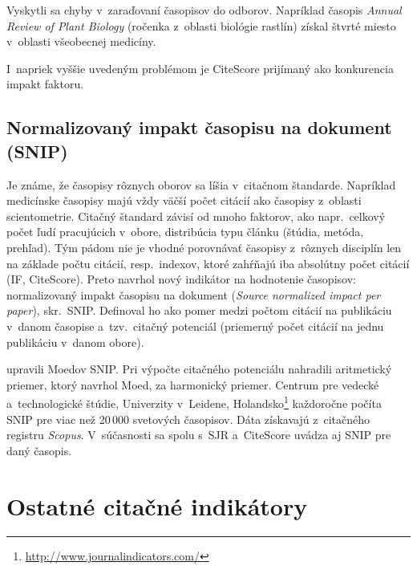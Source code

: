 Vyskytli sa chyby v~zaraďovaní časopisov do odborov.  Napríklad časopis
\emph{Annual Review of Plant Biology} (ročenka z~oblasti biológie rastlín)
získal štvrté miesto v~oblasti všeobecnej medicíny.

I~napriek vyššie uvedeným problémom je CiteScore prijímaný ako konkurencia
impakt faktoru.

\subsection{Normalizovaný impakt časopisu na dokument (SNIP)}
\label{sec:snip}

Je známe, že časopisy rôznych oborov sa líšia v~citačnom štandarde.  Napríklad
medicínske časopisy majú vždy väčší počet citácií ako časopisy z~oblasti
scientometrie.  Citačný štandard závisí od mnoho faktorov, ako napr.~celkový
počet ľudí pracujúcich v~obore, distribúcia typu článku (štúdia, metóda,
prehľad).  Tým pádom nie je vhodné porovnávať časopisy z~rôznych disciplín len
na základe počtu citácií, resp.~indexov, ktoré zahŕňajú iba absolútny počet
citácií (IF, CiteScore).  Preto \citet{Moed2010} navrhol nový indikátor na
hodnotenie časopisov: normalizovaný impakt časopisu na dokument (\emph{Source
  normalized impact per paper}), skr.~SNIP.  Definoval ho ako pomer medzi
počtom citácií na publikáciu v~danom časopise a~tzv.~citačný potenciál
(priemerný počet citácií na jednu publikáciu v~danom obore).

\citet{Waltman2013} upravili Moedov SNIP.  Pri výpočte citačného potenciálu
nahradili aritmetický priemer, ktorý navrhol Moed, za harmonický priemer.
Centrum pre vedecké a~technologické štúdie, Univerzity v~Leidene,
Holandsko\footnote{\url{http://www.journalindicators.com/}} každoročne počíta
SNIP pre viac než 20\,000 svetových časopisov.  Dáta získavajú z~citačného
registru \emph{Scopus}.  V~súčasnosti sa spolu s~SJR a~CiteScore uvádza aj SNIP
pre daný časopis.

\section{Ostatné citačné indikátory}

